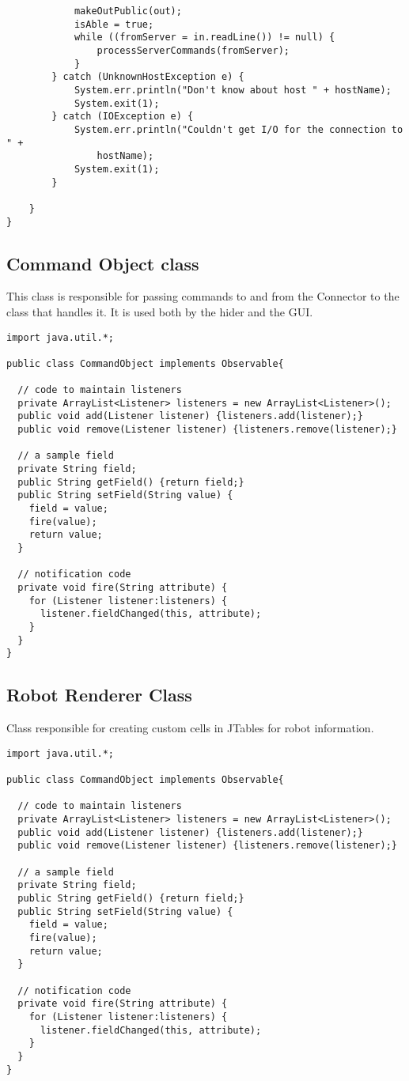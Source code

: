 \begin{lstlisting}
 			makeOutPublic(out);
 			isAble = true;
            while ((fromServer = in.readLine()) != null) {
            	processServerCommands(fromServer);
            }
        } catch (UnknownHostException e) {
            System.err.println("Don't know about host " + hostName);
            System.exit(1);
        } catch (IOException e) {
            System.err.println("Couldn't get I/O for the connection to " +
                hostName);
            System.exit(1);
        }

	}
}
\end{lstlisting}
\subsection{Command Object class}
This class is responsible for passing commands to and from the Connector to the class that handles it. It is used both by the hider and the GUI.
\begin{lstlisting}
import java.util.*;

public class CommandObject implements Observable{

  // code to maintain listeners
  private ArrayList<Listener> listeners = new ArrayList<Listener>();
  public void add(Listener listener) {listeners.add(listener);}
  public void remove(Listener listener) {listeners.remove(listener);}

  // a sample field
  private String field;
  public String getField() {return field;}
  public String setField(String value) {
    field = value;
    fire(value); 
    return value;   
  }

  // notification code
  private void fire(String attribute) {
    for (Listener listener:listeners) {
      listener.fieldChanged(this, attribute);
    }
  }
}
\end{lstlisting}
\subsection{Robot Renderer Class}
Class responsible for creating custom cells in JTables for robot information.
\begin{lstlisting}
import java.util.*;

public class CommandObject implements Observable{

  // code to maintain listeners
  private ArrayList<Listener> listeners = new ArrayList<Listener>();
  public void add(Listener listener) {listeners.add(listener);}
  public void remove(Listener listener) {listeners.remove(listener);}

  // a sample field
  private String field;
  public String getField() {return field;}
  public String setField(String value) {
    field = value;
    fire(value); 
    return value;   
  }

  // notification code
  private void fire(String attribute) {
    for (Listener listener:listeners) {
      listener.fieldChanged(this, attribute);
    }
  }
}
\end{lstlisting}

